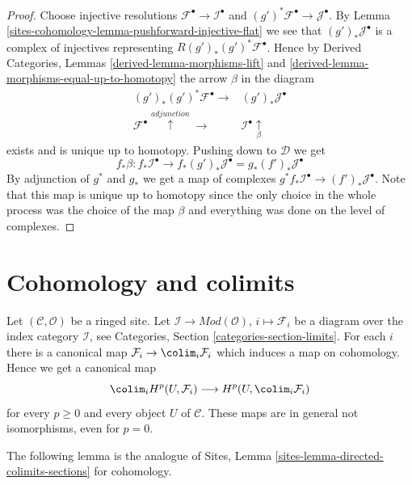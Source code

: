 \begin{proof}
Choose injective resolutions $\mathcal{F}^\bullet \to \mathcal{I}^\bullet$
and $(g')^*\mathcal{F}^\bullet \to \mathcal{J}^\bullet$.
By Lemma \ref{sites-cohomology-lemma-pushforward-injective-flat} we see that
$(g')_*\mathcal{J}^\bullet$ is a complex of injectives representing
$R(g')_*(g')^*\mathcal{F}^\bullet$. Hence by
Derived Categories, Lemmas \ref{derived-lemma-morphisms-lift}
and \ref{derived-lemma-morphisms-equal-up-to-homotopy}
the arrow $\beta$ in the diagram
$$
\begin{array}{cc}(g')_*(g')^*\mathcal{F}^\bullet \longrightarrow & (g')_*\mathcal{J}^\bullet \\ \mathcal{F}^\bullet \overset{adjunction}{\uparrow}\longrightarrow & \mathcal{I}^\bullet \underset{\beta}{\uparrow}\end{array}
$$
exists and is unique up to homotopy.
Pushing down to $\mathcal{D}$ we get
$$
f_*\beta :
f_*\mathcal{I}^\bullet
\longrightarrow
f_*(g')_*\mathcal{J}^\bullet
=
g_*(f')_*\mathcal{J}^\bullet
$$
By adjunction of $g^*$ and $g_*$ we get a map of complexes
$g^*f_*\mathcal{I}^\bullet \to (f')_*\mathcal{J}^\bullet$.
Note that this map is unique up to homotopy since the only
choice in the whole process was the choice of the map $\beta$
and everything was done on the level of complexes.
\end{proof}

\section{Cohomology and colimits}
\label{sites-cohomology-section-limits}
Let $(\mathcal{C}, \mathcal{O})$ be a ringed site.
Let $\mathcal{I} \to \textit{Mod}(\mathcal{O})$, $i \mapsto \mathcal{F}_i$
be a diagram over the index category $\mathcal{I}$, see
Categories, Section \ref{categories-section-limits}.
For each $i$ there is a canonical map
$\mathcal{F}_i \to \colim_i \mathcal{F}_i$ which induces
a map on cohomology. Hence we get a canonical map
$$
\colim_i H^p(U, \mathcal{F}_i)
\longrightarrow
H^p(U, \colim_i \mathcal{F}_i)
$$
for every $p \geq 0$ and every object $U$ of $\mathcal{C}$.
These maps are in general not isomorphisms, even for $p = 0$.

\medskip\noindent
The following lemma is the analogue of
Sites, Lemma \ref{sites-lemma-directed-colimits-sections}
for cohomology.

